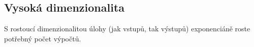 










\subsection{Vysoká dimenzionalita}
S rostoucí dimenzionalitou úlohy (jak vstupů, tak výstupů) exponenciáně roste potřebný počet výpočtů. 

